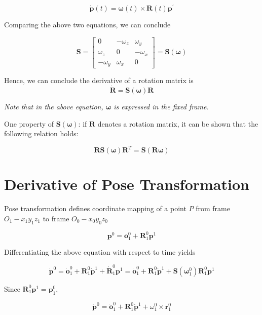 \documentclass[10pt]{article}
\begin{document}
$$
\dot{\boldsymbol{p}}(t)=\boldsymbol{\omega}(t) \times \boldsymbol{R}(t) \boldsymbol{p}^{\prime}
$$

Comparing the above two equations, we can conclude

$$
\boldsymbol{S}=\left[\begin{array}{ccc}
0 & -\omega_{z} & \omega_{y} \\
\omega_{z} & 0 & -\omega_{x} \\
-\omega_{y} & \omega_{x} & 0
\end{array}\right]=\boldsymbol{S}(\boldsymbol{\omega})
$$

Hence, we can conclude the derivative of a rotation matrix is 
$$
\dot{\boldsymbol{R}}=\boldsymbol{S}(\boldsymbol{\omega}) \boldsymbol{R}$$


\emph{Note that in the above equation, $\boldsymbol{\omega}$ is expressed in the fixed frame.}


One property of $\boldsymbol{S}(\boldsymbol{\omega})$: if $\boldsymbol{R}$ denotes a rotation matrix, it can be shown that the following relation holds:

$$
    \boldsymbol{R} \boldsymbol{S}(\boldsymbol{\omega}) \boldsymbol{R}^{T}=\boldsymbol{S}(\boldsymbol{R} \boldsymbol{\omega})
$$

\section{Derivative of Pose Transformation}

Pose transformation defines coordinate mapping of a point $P$ from frame $O_1-x_1y_1z_1$ to frame $O_0-x_0y_0z_0$

$$
\boldsymbol{p}^{0}=\boldsymbol{o}_{1}^{0}+\boldsymbol{R}_{1}^{0} \boldsymbol{p}^{1}
$$

Differentiating the above equation with respect to time yields

$$
\dot{\boldsymbol{p}}^{0}=\dot{\boldsymbol{o}}_{1}^{0}+\boldsymbol{R}_{1}^{0} \dot{\boldsymbol{p}}^{1}+\dot{\boldsymbol{R}}_{1}^{0} \boldsymbol{p}^{1}=\dot{\boldsymbol{o}}_{1}^{0}+\boldsymbol{R}_{1}^{0} \dot{\boldsymbol{p}}^{1}+\boldsymbol{S}\left(\boldsymbol{\omega}_{1}^{0}\right) \boldsymbol{R}_{1}^{0} \boldsymbol{p}^{1}
$$





Since $\boldsymbol{R}_{1}^{0} \boldsymbol{p}^{1}=\boldsymbol{p}_{1}^{0}$, 

$$
    \dot{\boldsymbol{p}}^{0}=\dot{\boldsymbol{o}}_{1}^{0}+\boldsymbol{R}_{1}^{0} \dot{\boldsymbol{p}}^{1}+\omega_{1}^{0} \times \boldsymbol{r}_{1}^{0}
    $$
    
\end{document}
